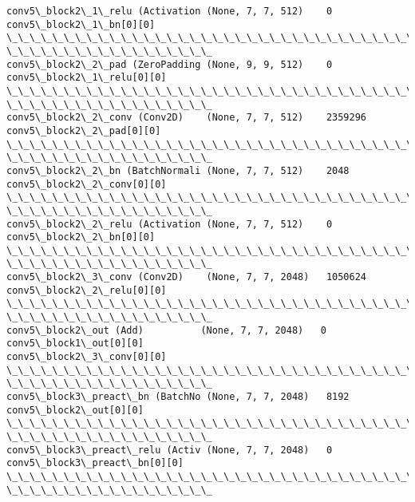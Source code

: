 \documentclass[11pt]{article}
\begin{document}
\begin{Verbatim}[commandchars=\\\{\}]
conv5\_block2\_1\_relu (Activation (None, 7, 7, 512)    0
conv5\_block2\_1\_bn[0][0]
\_\_\_\_\_\_\_\_\_\_\_\_\_\_\_\_\_\_\_\_\_\_\_\_\_\_\_\_\_\_\_\_\_\_\_\_\_\_\_\_\_\_\_\_\_\_\_\_\_\_\_\_\_\_\_\_\_\_\_\_\_\_\_\_\_\_\_\_\_\_\_\_\_\_\_\_\_\_\_\_
\_\_\_\_\_\_\_\_\_\_\_\_\_\_\_\_\_\_
conv5\_block2\_2\_pad (ZeroPadding (None, 9, 9, 512)    0
conv5\_block2\_1\_relu[0][0]
\_\_\_\_\_\_\_\_\_\_\_\_\_\_\_\_\_\_\_\_\_\_\_\_\_\_\_\_\_\_\_\_\_\_\_\_\_\_\_\_\_\_\_\_\_\_\_\_\_\_\_\_\_\_\_\_\_\_\_\_\_\_\_\_\_\_\_\_\_\_\_\_\_\_\_\_\_\_\_\_
\_\_\_\_\_\_\_\_\_\_\_\_\_\_\_\_\_\_
conv5\_block2\_2\_conv (Conv2D)    (None, 7, 7, 512)    2359296
conv5\_block2\_2\_pad[0][0]
\_\_\_\_\_\_\_\_\_\_\_\_\_\_\_\_\_\_\_\_\_\_\_\_\_\_\_\_\_\_\_\_\_\_\_\_\_\_\_\_\_\_\_\_\_\_\_\_\_\_\_\_\_\_\_\_\_\_\_\_\_\_\_\_\_\_\_\_\_\_\_\_\_\_\_\_\_\_\_\_
\_\_\_\_\_\_\_\_\_\_\_\_\_\_\_\_\_\_
conv5\_block2\_2\_bn (BatchNormali (None, 7, 7, 512)    2048
conv5\_block2\_2\_conv[0][0]
\_\_\_\_\_\_\_\_\_\_\_\_\_\_\_\_\_\_\_\_\_\_\_\_\_\_\_\_\_\_\_\_\_\_\_\_\_\_\_\_\_\_\_\_\_\_\_\_\_\_\_\_\_\_\_\_\_\_\_\_\_\_\_\_\_\_\_\_\_\_\_\_\_\_\_\_\_\_\_\_
\_\_\_\_\_\_\_\_\_\_\_\_\_\_\_\_\_\_
conv5\_block2\_2\_relu (Activation (None, 7, 7, 512)    0
conv5\_block2\_2\_bn[0][0]
\_\_\_\_\_\_\_\_\_\_\_\_\_\_\_\_\_\_\_\_\_\_\_\_\_\_\_\_\_\_\_\_\_\_\_\_\_\_\_\_\_\_\_\_\_\_\_\_\_\_\_\_\_\_\_\_\_\_\_\_\_\_\_\_\_\_\_\_\_\_\_\_\_\_\_\_\_\_\_\_
\_\_\_\_\_\_\_\_\_\_\_\_\_\_\_\_\_\_
conv5\_block2\_3\_conv (Conv2D)    (None, 7, 7, 2048)   1050624
conv5\_block2\_2\_relu[0][0]
\_\_\_\_\_\_\_\_\_\_\_\_\_\_\_\_\_\_\_\_\_\_\_\_\_\_\_\_\_\_\_\_\_\_\_\_\_\_\_\_\_\_\_\_\_\_\_\_\_\_\_\_\_\_\_\_\_\_\_\_\_\_\_\_\_\_\_\_\_\_\_\_\_\_\_\_\_\_\_\_
\_\_\_\_\_\_\_\_\_\_\_\_\_\_\_\_\_\_
conv5\_block2\_out (Add)          (None, 7, 7, 2048)   0
conv5\_block1\_out[0][0]
conv5\_block2\_3\_conv[0][0]
\_\_\_\_\_\_\_\_\_\_\_\_\_\_\_\_\_\_\_\_\_\_\_\_\_\_\_\_\_\_\_\_\_\_\_\_\_\_\_\_\_\_\_\_\_\_\_\_\_\_\_\_\_\_\_\_\_\_\_\_\_\_\_\_\_\_\_\_\_\_\_\_\_\_\_\_\_\_\_\_
\_\_\_\_\_\_\_\_\_\_\_\_\_\_\_\_\_\_
conv5\_block3\_preact\_bn (BatchNo (None, 7, 7, 2048)   8192
conv5\_block2\_out[0][0]
\_\_\_\_\_\_\_\_\_\_\_\_\_\_\_\_\_\_\_\_\_\_\_\_\_\_\_\_\_\_\_\_\_\_\_\_\_\_\_\_\_\_\_\_\_\_\_\_\_\_\_\_\_\_\_\_\_\_\_\_\_\_\_\_\_\_\_\_\_\_\_\_\_\_\_\_\_\_\_\_
\_\_\_\_\_\_\_\_\_\_\_\_\_\_\_\_\_\_
conv5\_block3\_preact\_relu (Activ (None, 7, 7, 2048)   0
conv5\_block3\_preact\_bn[0][0]
\_\_\_\_\_\_\_\_\_\_\_\_\_\_\_\_\_\_\_\_\_\_\_\_\_\_\_\_\_\_\_\_\_\_\_\_\_\_\_\_\_\_\_\_\_\_\_\_\_\_\_\_\_\_\_\_\_\_\_\_\_\_\_\_\_\_\_\_\_\_\_\_\_\_\_\_\_\_\_\_
\_\_\_\_\_\_\_\_\_\_\_\_\_\_\_\_\_\_

\end{Verbatim}
\end{document}
